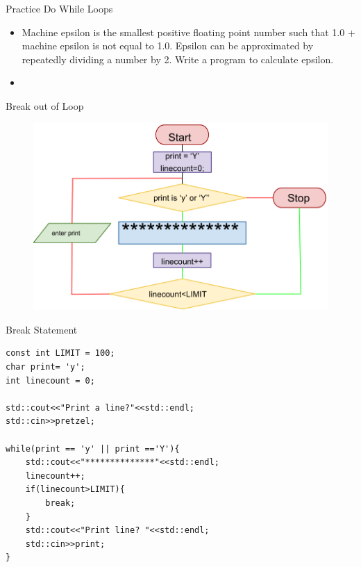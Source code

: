 \documentclass[xcolor={dvipsnames}]{beamer}
\begin{document}
\begin{frame}{Practice Do While Loops}
\begin{itemize}
	\item Machine epsilon is the smallest positive floating point number such that 1.0 + machine epsilon is not equal to 1.0. Epsilon can be approximated by repeatedly dividing a number by 2. Write a program to calculate epsilon. 
	\item
\end{itemize}
\end{frame}

\begin{frame}{Break out of Loop}
	\begin{figure}
		\includegraphics[width=1\textwidth]{break_line}
	\end{figure}
\end{frame}

\begin{frame}[fragile]{Break Statement}
\begin{verbatim}
const int LIMIT = 100;
char print= 'y';
int linecount = 0;

std::cout<<"Print a line?"<<std::endl;
std::cin>>pretzel;

while(print == 'y' || print =='Y'){
    std::cout<<"**************"<<std::endl;
    linecount++;
    if(linecount>LIMIT){
        break;     
    }
    std::cout<<"Print line? "<<std::endl;
    std::cin>>print;
}
\end{verbatim}
\end{frame}
\end{document}
